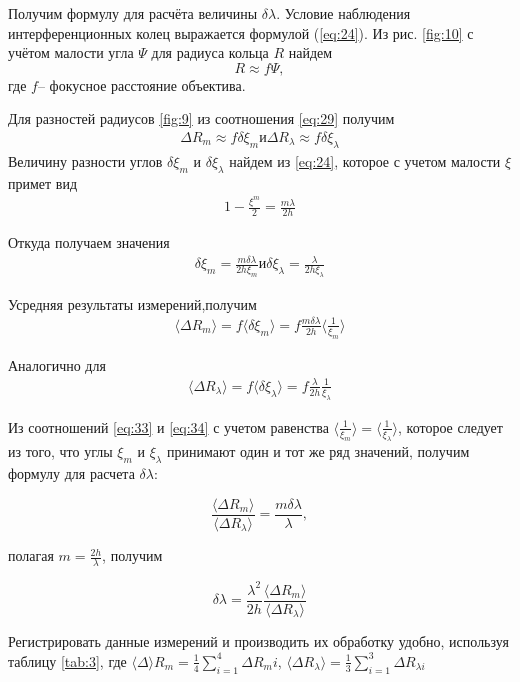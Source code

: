 Получим формулу для расчёта величины $\delta \lambda$. Условие наблюдения интерференционных колец выражается формулой (\ref{eq:24}). Из рис. \ref{fig:10}  с учётом малости угла $\Psi$ для радиуса кольца $R$ найдем
\begin{equation}
	R\approx f\Psi,
\end{equation}
где $f$-- фокусное расстояние объектива.


Для разностей радиусов \ref{fig:9} из соотношения \ref{eq:29} получим 
\begin{gather}
	\label{eq:30}
	\Delta R_m \approx f \delta \xi_m и \Delta R_{\lambda} \approx f \delta \xi_{\lambda} 
\end{gather}
Величину  разности углов $\delta \xi_m$ и $\delta \xi_{\lambda}$ найдем из \ref{eq:24}, которое с учетом малости $\xi$ примет вид
\begin{gather}
	\label{eq:31}
	1-\frac{\xi^m}{2}=\frac{m\lambda}{2h}
\end{gather}

Откуда получаем значения 
\begin{gather}
	\label{eq:32}
	\delta \xi_m=\frac{m\delta \lambda}{2h\xi_m} и \delta \xi_{\lambda}=\frac{\lambda}{2h\xi_{\lambda}}
\end{gather}

Усредняя результаты измерений,получим
\begin{gather}
	\label{eq:33}
 	\langle \Delta R_m \rangle  = f \langle\delta \xi_m\rangle =f\frac{m\delta \lambda}{2h}  \langle\frac{1}{\xi_m} \rangle
\end{gather}

Аналогично для
\begin{gather}
	\label{eq:34}
	\langle\Delta R_{\lambda}\rangle  = f \langle\delta \xi_{\lambda}\rangle =f\frac{\lambda}{2h}  \frac{1}{\xi_{\lambda}} 
\end{gather}

Из соотношений \ref{eq:33} и \ref{eq:34} с учетом равенства $ \langle\frac{1}{\xi_m}\rangle = \langle\frac{1}{\xi_{\lambda}} \rangle$, 
которое следует из того, что углы $\xi_m$ и $\xi_{\lambda}$ принимают один и тот же ряд значений, получим формулу для расчета 
$\delta \lambda$: 

\begin{equation}
	\frac{\langle \Delta R_m \rangle}{\langle \Delta R_{\lambda}\rangle}=\frac{m \delta \lambda}{\lambda},
\end{equation}

полагая $m=\frac{2h}{\lambda}$, получим

\begin{equation}
	\label{eq:35}
	\delta \lambda = \frac{\lambda^2}{2h} \frac{\langle \Delta R_m \rangle}{\langle \Delta R_{\lambda}\rangle}
\end{equation}

Регистрировать данные измерений и производить их обработку удобно, используя таблицу \ref{tab:3}, где $ \langle \Delta \rangle R_m  = \frac{1}{4} \sum^4_{i=1} \Delta R_mi$, $ \langle \Delta  R_{\lambda} \rangle = \frac{1}{3} \sum^3_{i=1} \Delta R_{\lambda i}$